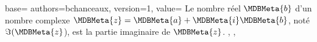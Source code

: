 {
  base={
    authors={bchanceaux},
    version={1},
    value={%
      Le nombre réel $\MDBMeta{b}$ d'un nombre complexe
      $\MDBMeta{z} = \MDBMeta{a} + \MDBMeta{i} \MDBMeta{b}$, noté \(\Im(\MDBMeta{z}\)), est la partie imaginaire de \(\MDBMeta{z}\).
    },
  },
}
